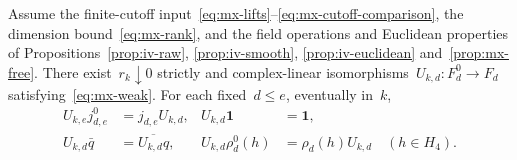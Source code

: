 \begin{proposition}\label{prop:mx-frames}
Assume the finite-cutoff input~\eqref{eq:mx-lifts}--\eqref{eq:mx-cutoff-comparison}, the dimension bound~\eqref{eq:mx-rank}, and the field operations and Euclidean properties of Propositions~\ref{prop:iv-raw}, \ref{prop:iv-smooth}, \ref{prop:iv-euclidean} and~\ref{prop:mx-free}.
There exist~$r_k\downarrow0$ strictly and complex-linear isomorphisms~$U_{k,d}:F_d^0\to F_d$ satisfying~\eqref{eq:mx-weak}.
For each fixed~$d\le e$, eventually in~$k$,
\begin{equation}\label{eq:mx-compatible}
 \begin{aligned}
 U_{k,e}j^0_{d,e}&=j_{d,e}U_{k,d},& U_{k,d}\mathbf1&=\mathbf1,\\
 U_{k,d}\bar q&=\overline{U_{k,d}q},&
 U_{k,d}\rho_d^0(h)&=\rho_d(h)U_{k,d}\quad(h\in H_4).
 \end{aligned}
\end{equation}
\end{proposition}

